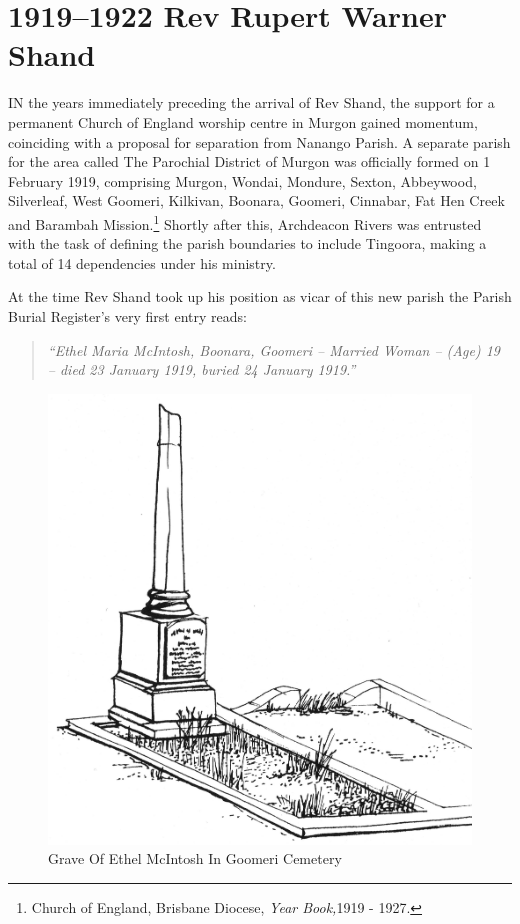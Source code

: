 \balance


\printendnotes[custom]
\setcounter{endnote}{0}
\chapter{1919--1922 Rev Rupert Warner Shand}
\nobalance


\lettrine[lines=3]{I}{N}
 the years immediately preceding the arrival of Rev Shand, the support for a permanent Church of England worship centre in Murgon gained momentum, coinciding with a proposal for separation from Nanango Parish. A separate parish for the area called The Parochial District of Murgon was officially formed on 1 February 1919, comprising Murgon, Wondai, Mondure, Sexton, Abbeywood, Silverleaf, West Goomeri, Kilkivan, Boonara, Goomeri, Cinnabar, Fat Hen Creek and Barambah Mission.\footnote{Church of England, Brisbane Diocese, \emph{Year Book,}1919 - 1927.} Shortly after this, Archdeacon Rivers was entrusted with the task of defining the parish boundaries to include Tingoora, making a total of 14 dependencies under his ministry.

At the time Rev Shand took up his position as vicar of this new parish the Parish Burial Register's very first entry reads:



\begin{quote}

\emph{``Ethel Maria McIntosh, Boonara, Goomeri -- Married Woman -- (Age) 19 -- died 23 January 1919, buried 24 January 1919.''}

\end{quote}









\begin{figure}
\begin{center}
\includegraphics[width=.7\linewidth,center]{../images/graveOfEthelMcIntoshInGoomeriCemetery.jpg}
\caption{Grave Of Ethel McIntosh In Goomeri Cemetery}
\end{center}
\end{figure}




